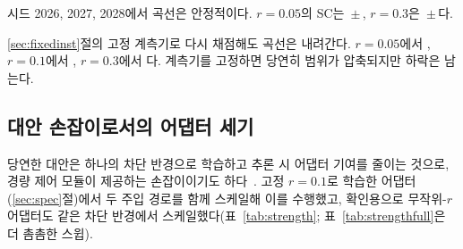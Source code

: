 \documentclass[10pt,twocolumn,a4paper]{article}
\begin{document}
시드 2026, 2027, 2028에서 곡선은 안정적이다. $r{=}0.05$의 SC는
\seedMeanZeroFive{}\,$\pm$\,\seedStdZeroFive{}, $r{=}0.3$은
\seedMeanThreeZero{}\,$\pm$\,\seedStdThreeZero{}다.

\ref{sec:fixedinst}절의 고정 계측기로 다시 채점해도 곡선은 내려간다. $r{=}0.05$에서
\fixInstZeroFive{}, $r{=}0.1$에서 \fixInstOneZero{}, $r{=}0.3$에서 \fixInstThreeZero{}다.
계측기를 고정하면 당연히 범위가 압축되지만 하락은 남는다.

\subsection{대안 손잡이로서의 어댑터 세기}
\label{sec:strength}
당연한 대안은 하나의 차단 반경으로 학습하고 추론 시 어댑터 기여를 줄이는 것으로, 경량
제어 모듈이 제공하는 손잡이이기도 하다~\cite{feng2025simplifying}. 고정 $r{=}0.1$로 학습한
어댑터(\ref{sec:spec}절)에서 두 주입 경로를 함께 스케일해 이를 수행했고, 확인용으로
무작위-$r$ 어댑터도 같은 차단 반경에서 스케일했다(표~\ref{tab:strength}; 표~\ref{tab:strengthfull}은
더 촘촘한 스윕).
\end{document}
